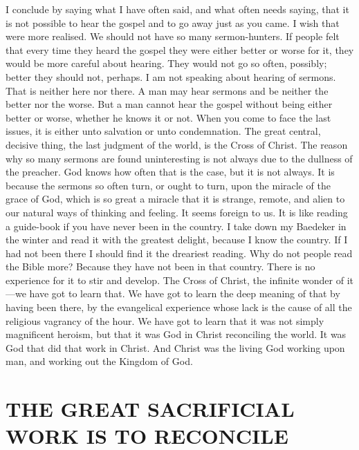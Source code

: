 \documentclass[12pt,letterpaper,oneside]{book}
\begin{document}
I conclude by saying what I have often said, 
and what often needs saying, that it is not 
possible to hear the gospel and to go away just 
as you came. I wish that were more realised. 
We should not have so many sermon-hunters. 
If people felt that every time they heard the 
gospel they were either better or worse for it, 
they would be more careful about hearing. 
They would not go so often, possibly; better they 
should not, perhaps. I am not speaking about 
hearing of sermons. That is neither here nor 
there. A man may hear sermons and be neither 
the better nor the worse. But a man cannot 
hear the gospel without being either better or 
worse, whether he knows it or not. When you 
come to face the last issues, it is either unto 
salvation or unto condemnation. The great 
central, decisive thing, the last judgment of the 
world, is the Cross of Christ. The reason why 
so many sermons are found uninteresting is not 
always due to the dullness of the preacher. God 
knows how often that is the case, but it is not 
always. It is because the sermons so often turn, 
or ought to turn, upon the miracle of the grace 
of God, which is so great a miracle that it is 
strange, remote, and alien to our natural ways 
of thinking and feeling. It seems foreign to us. 
It is like reading a guide-book if you have never 
been in the country. I take down my Baedeker 
in the winter and read it with the greatest 
delight, because I know the country. If I had 
not been there I should find it the dreariest reading. 
Why do not people read the Bible more? 
Because they have not been in that country. 
There is no experience for it to stir and develop. 
The Cross of Christ, the infinite wonder of it---we 
have got to learn that. We have got to 
learn the deep meaning of that by having been 
there, by the evangelical experience whose lack 
is the cause of all the religious vagrancy of the 
hour. We have got to learn that it was not 
simply magnificent heroism, but that it was God 
in Christ reconciling the world. It was God 
that did that work in Christ. And Christ was 
the living God working upon man, and working 
out the Kingdom of God. 


\chapter{THE GREAT SACRIFICIAL WORK 
IS TO RECONCILE} 


\end{document}
